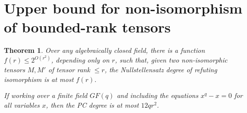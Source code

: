 \documentclass[10pt,a4paper]{article}
\newtheorem{theorem}{Theorem}[section]
\theoremstyle{definition}
\begin{document}
\medskip




\setcounter{section}{3}



\section{Upper bound for non-isomorphism of bounded-rank tensors} \label{sec:upper}
\begin{theorem} \label{thm:lowrank}
Over any algebraically closed field, there is a function $f(r) \leq 2^{O(r^2)}$, depending only on $r$, such that, given two non-isomorphic tensors $M,M'$ of tensor rank $\leq r$, the Nullstellensatz degree of refuting isomorphism is at most $f(r)$.

If working over a finite field $GF(q)$ and including the equations $x^q - x = 0$ for all variables $x$, then the PC degree is at most $12qr^2$.
\end{theorem} 
\end{document}
